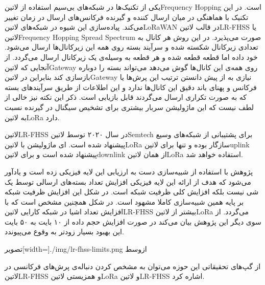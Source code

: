 
یکی از تکنیک‌ها در شبکه‌های بی‌سیم استفاده از ‌لاتین{Frequency Hopping} است. در این تکنیک با هماهنگی در میان ارسال کننده و گیرنده فرکانس‌های ارسال در زمان
تغییر می‌کند. پیاده‌سازی این شیوه در شبکه‌های ‌لاتین{LoRaWAN} در قالب ‌لاتین{LR-FHSS} یا
‌لاتین{Frequency Hopping Spread Spectrum}
صورت می‌پذیرد. در این روش هر کانال به تعدادی زیرکانال شکسته شده و سرآیند بسته روی همه این زیرکانال‌ها ارسال می‌شود.
خود داده اما قطعه قطعه شده و هر قطعه به وسیله‌ی یک زیرکانال ارسال می‌گردد.
از آنجایی که ‌لاتین{Gateway} روی همه‌ی این کانال‌ها گوش می‌دهد می‌تواند بسته را دوباره بازسازی کند بنابراین
در ‌لاتین{Gateway} نیازی به از پیش دانستن ترتیب این پرش‌ها یا فرکانس و پهنای باند دقیق این کانال‌ها ندارد
و این اطلاعات از طریق سرآیندهای بسته که به صورت تکراری ارسال می‌گردند قابل بازیابی است.
ذکر این نکته نیز خالی از لطف نیست که این ماژولیشن سربار بیشتری برای تشخیص سیگنال در گیرنده نسبت به ‌لاتین{LoRa} دارد.

‌لاتین{LR-FHSS} در سال ۲۰۲۰ توسط ‌لاتین{Semtech} برای پشتیبانی از شبکه‌های وسیع پیشنهاد شده است.
ای ماژولیشن با ‌لاتین{LoRa} سازگار بوده و تنها برای ‌لاتین{uplink} پیشنهاد شده است و برای ‌لاتین{downlink} از همان
‌لاتین{LoRa} استفاده خواهد شد.

پژوهش  با استفاده از شبیه‌سازی دست به ارزیابی این لایه فیزیکی زده است و یادآور می‌شود که هدف از ارائه این لایه فیزیکی
افزایش تعداد بسته‌های ارسالی توسط یک شی نیست بلکه افزایش کلی ظرفیت شبکه است. در شکل  این افزایش ظرفیت شبکه بر پایه همین
شبیه‌سازی کاملا مشهود است. در شکل  همچنین مشخص است که با افزایش تعداد اشیا در شبکه کارایی ‌لاتین{LR-FHSS} بیشتر از ‌لاتین{LoRa}
می‌گردد. از سوی دیگر این پژوهش بیان می‌کند در صورت افزایش حجم داده از ۱۰ بایت به ۵۰ بایت این بهبود بسیار زودتر به وقوع می‌پیوندد.

‌تصویر[width=\textwidth]{./img/lr-fhss-limits.png}
‌ازوسط

از گپ‌های تحقیقاتی این حوزه می‌توان به مشخص کردن دنباله‌ی پرش‌های فرکانسی در ‌لاتین{LR-FHSS} و همزیستی ‌لاتین{LoRa} و ‌لاتین{LR-FHSS} اشاره کرد.


